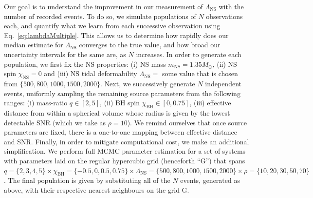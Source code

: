 \documentclass[aps,prd,amsmath,floats,floatfix, twocolumn,
superscriptaddress,nofootinbib,showpacs]{revtex4-1}
\newcommand{\lambdans}{\Lambda_\mathrm{NS}}
\newcommand{\chibh}{\chi_\mathrm{BH}}
\newcommand{\chins}{\chi_\mathrm{NS}}
\newcommand{\mns}{m_\mathrm{NS}}
\begin{document}
Our goal is to understand the improvement in our measurement of $\lambdans$
with the number of recorded events. To do so, we simulate populations of $N$
observations each, and quantify what we learn from each successive observation 
using Eq.~\ref{eq:lambdaMultiple}. This allows us to determine how
rapidly does our median estimate for $\lambdans$ converges to the true value,
and how broad our uncertainty intervals for the same are, as $N$ increases.
In order to generate each population, we first fix
the NS properties: (i) NS mass $\mns=1.35M_\odot$, (ii) NS spin $\chins=0$
and (iii) NS tidal deformability $\lambdans=$ some value that is chosen from
$\{500,800,1000,1500,2000\}$. Next, we successively generate $N$ 
independent events, uniformly sampling the remaining
source parameters from the following ranges: (i) mass-ratio $q\in[2,5]$, (ii)
BH spin $\chibh\in[0, 0.75]$, (iii) effective distance from within a 
spherical volume whose radius is given by the lowest detectable
SNR (which we take as $\rho=10$). We remind ourselves that
once source parameters are fixed, there is a one-to-one mapping between
effective distance and SNR. Finally, in order to mitigate computational
cost, we make an additional simplification.
We perform full MCMC parameter estimation for a set of systems with parameters
laid on the regular hypercubic grid (henceforth ``G'') that spans
$q=\{2,3,4,5\}\times\chibh=\{-0.5,0,0.5,0.75\}\times\lambdans=\{500,800,1000,1500,2000\}\times\rho=\{10,20,30,50,70\}$.
The final population is given by substituting all of the $N$ events, generated
as above, with their respective nearest neighbours on the grid G.
\end{document}
